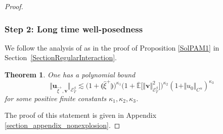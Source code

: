 \documentclass[JEP,XML,SOM,Unicode,published]{cedram}
\newtheorem{thm}{Theorem}
\theoremstyle{definition}
\newcommand\bbE{\mathbb{E}}
\newcommand{\mcE}{\mathcal{E}}
\newcommand{\bsu}{\boldsymbol{u}}
\newcommand{\bsv}{\boldsymbol{v}}
\newcommand{\norme}[1]{\Vert #1 \Vert}
\begin{document}
\begin{proof}
\subsubsection*{Step 2: Long time well-posedness} We follow the analysis of \cite{ShenZhuZhu} as in the proof of Proposition \ref{SolPAM1} in Section~\ref{SectionRegularInteraction}.

\begin{thm}\label{thm_nonexplosionA} One has a polynomial bound
\begin{equation} \label{EqNonExplosionMeanField}
\big\Vert {\bsu}_{\widehat\xi^+, {\bsv}}\big\Vert_{\mcE^\beta_T} \lesssim \bigl(1 + \llparenthesis \widehat\xi^+ \rrparenthesis \bigr)^{\kappa_1} \bigl(1+\overline{\bbE}\bigl[\norme{\bsv}^2_{\mcE^\beta_T}\bigr]\bigr)^{\kappa_2}(1+\norme{u_0}_{C^\alpha})^{\kappa_3}
\end{equation}
for some positive finite constants $\kappa_1,\kappa_2,\kappa_3$.
\end{thm}

The proof of this statement is given in Appendix \ref{section_appendix_nonexplosion}.


\end{proof}
\end{document}

